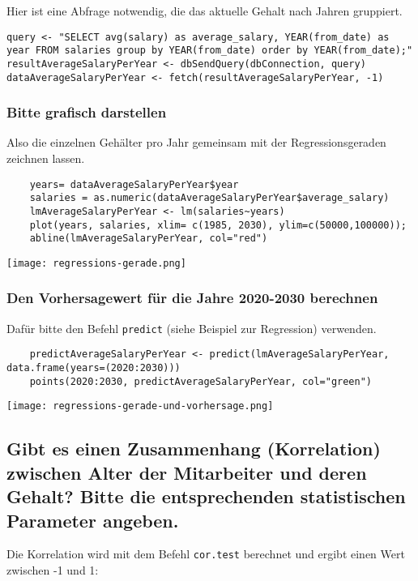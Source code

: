 \documentclass{article}
\begin{document}
Hier ist eine Abfrage notwendig, die das aktuelle Gehalt nach Jahren gruppiert.
\begin{lstlisting}
query <- "SELECT avg(salary) as average_salary, YEAR(from_date) as year FROM salaries group by YEAR(from_date) order by YEAR(from_date);"
resultAverageSalaryPerYear <- dbSendQuery(dbConnection, query)
dataAverageSalaryPerYear <- fetch(resultAverageSalaryPerYear, -1)
\end{lstlisting}
	
\subsubsection{Bitte grafisch darstellen}

Also die einzelnen Gehälter pro Jahr gemeinsam mit der Regressionsgeraden zeichnen lassen.
\begin{lstlisting}
	years= dataAverageSalaryPerYear$year
	salaries = as.numeric(dataAverageSalaryPerYear$average_salary)
	lmAverageSalaryPerYear <- lm(salaries~years)
	plot(years, salaries, xlim= c(1985, 2030), ylim=c(50000,100000));
	abline(lmAverageSalaryPerYear, col="red")
\end{lstlisting}
\texttt{[image: regressions-gerade.png]}
\subsubsection{Den Vorhersagewert für die Jahre 2020-2030 berechnen}

Dafür bitte den Befehl \texttt{predict} (siehe Beispiel zur Regression) verwenden.
\begin{lstlisting}
	predictAverageSalaryPerYear <- predict(lmAverageSalaryPerYear, data.frame(years=(2020:2030)))
	points(2020:2030, predictAverageSalaryPerYear, col="green")
\end{lstlisting}
\texttt{[image: regressions-gerade-und-vorhersage.png]}
\subsection{Gibt es einen Zusammenhang (Korrelation) zwischen Alter der Mitarbeiter und deren Gehalt? Bitte die entsprechenden statistischen Parameter angeben.}


Die Korrelation wird mit dem Befehl \texttt{cor.test} berechnet und ergibt einen Wert zwischen -1 und 1:
\end{document}
